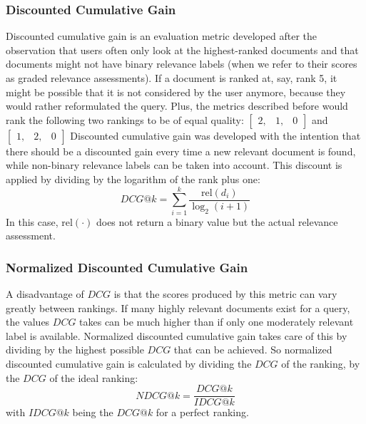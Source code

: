 \subsubsection{Discounted Cumulative Gain}
Discounted cumulative gain is an evaluation metric developed after the observation that users often only look at the highest-ranked documents and that documents might not have binary relevance labels (when we refer to their scores as graded relevance assessments).
If a document is ranked at, say, rank 5, it might be possible that it is not considered by the user anymore, because they would rather reformulated the query. Plus, the metrics described before would rank the following two rankings to be of equal quality: 
$\left[
\begin{smallmatrix}
	2, & 1, & 0
\end{smallmatrix}
\right]$ and $\left[
\begin{smallmatrix}
	1, & 2, & 0
\end{smallmatrix}
\right]$
Discounted cumulative gain was developed with the intention that there should be a discounted gain every time a new relevant document is found, while non-binary relevance labels can be taken into account. This discount is applied by dividing by the logarithm of the rank plus one: 
\begin{equation}
	\textit{DCG}@k = \sum^k_{i=1} \frac{\text{rel}(d_i)}{\log_2(i+1)}
\end{equation}
In this case, $\text{rel}(\cdot)$ does not return a binary value but the actual relevance assessment.

\subsubsection{Normalized Discounted Cumulative Gain}
A disadvantage of $\textit{DCG}$ is that the scores produced by this metric can vary greatly between rankings. If many highly relevant documents exist for a query, the values $\textit{DCG}$ takes can be much higher than if only one moderately relevant label is available. Normalized discounted cumulative gain takes care of this by dividing by the highest possible $\textit{DCG}$ that can be achieved. So normalized discounted cumulative gain is calculated by dividing the $\textit{DCG}$ of the ranking, by the $\textit{DCG}$ of the ideal ranking:  
\begin{equation}
	\textit{NDCG}@k = \frac{\textit{DCG}@k}{\textit{IDCG}@k} 
\end{equation}
with $\textit{IDCG}@k$ being the $\textit{DCG}@k$ for a perfect ranking. 

